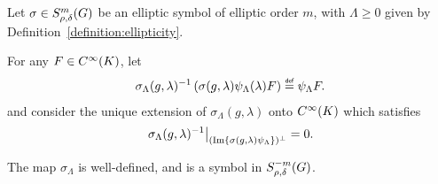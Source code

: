 \begin{lemma}
    Let $\sigma \in S^{m}_{\rho, \delta}(G)$ be an elliptic symbol of elliptic order $m$,
    with $\Lambda \geq 0$ given by Definition~\ref{definition:ellipticity}.

    For any $F \in {C^\infty(K)}$,
    let
    \begin{align*}
        \sigma_\Lambda(g, \lambda)^{-1} \left(\sigma(g, \lambda) \psi_\Lambda(\lambda) F\right) \defeq \psi_\Lambda F.
    \end{align*}
    and consider the unique extension of $\sigma_\Lambda(g, \lambda)$ onto ${C^\infty(K)}$ which satisfies
    \begin{align*}
        \eval {%
            \sigma_\Lambda(g, \lambda)^{-1}
            } {(\Image \{\sigma(g, \lambda) \psi_\Lambda\})^\perp} = 0.
    \end{align*}

    The map $\sigma_\Lambda$ is well-defined,
    and is a symbol in $S^{-m}_{\rho, \delta}(G)$.
\end{lemma}
